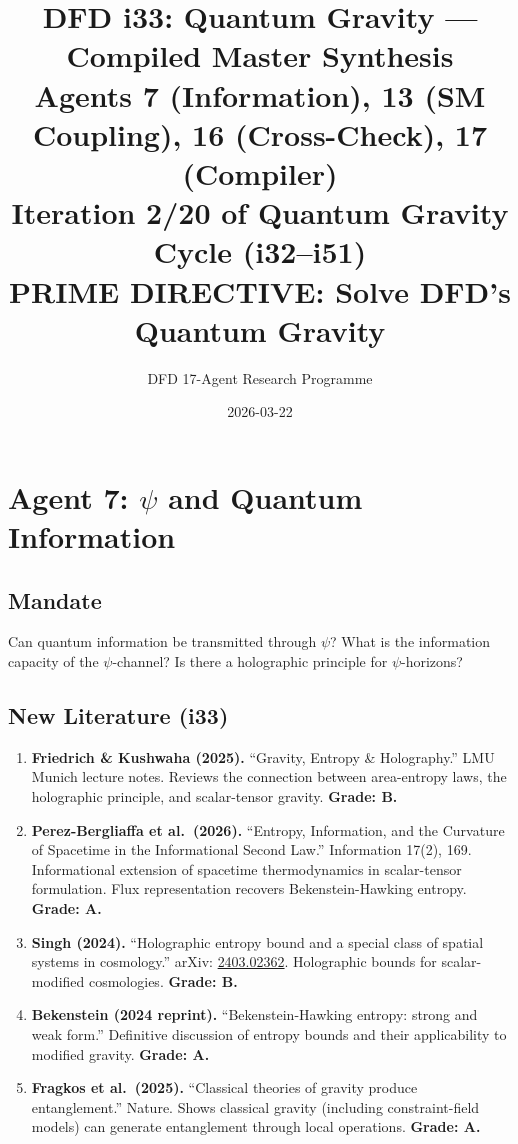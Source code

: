 \documentclass[11pt,a4paper]{article}
\title{DFD i33: Quantum Gravity --- Compiled Master Synthesis\\[6pt]
\large Agents 7 (Information), 13 (SM Coupling), 16 (Cross-Check), 17 (Compiler)\\[6pt]
\normalsize Iteration 2/20 of Quantum Gravity Cycle (i32--i51)\\
PRIME DIRECTIVE: Solve DFD's Quantum Gravity}
\author{DFD 17-Agent Research Programme}
\date{2026-03-22}
\begin{document}
\maketitle
\tableofcontents
\newpage

\section{Agent 7: $\psi$ and Quantum Information}
\label{sec:agent7}

\subsection{Mandate}

Can quantum information be transmitted through $\psi$? What is the information capacity of the $\psi$-channel? Is there a holographic principle for $\psi$-horizons?

\subsection{New Literature (i33)}

\begin{enumerate}
\item \textbf{Friedrich \& Kushwaha (2025).} ``Gravity, Entropy \& Holography.'' LMU Munich lecture notes. Reviews the connection between area-entropy laws, the holographic principle, and scalar-tensor gravity. \textbf{Grade: B.}

\item \textbf{Perez-Bergliaffa et al.\ (2026).} ``Entropy, Information, and the Curvature of Spacetime in the Informational Second Law.'' Information 17(2), 169. Informational extension of spacetime thermodynamics in scalar-tensor formulation. Flux representation recovers Bekenstein-Hawking entropy. \textbf{Grade: A.}

\item \textbf{Singh (2024).} ``Holographic entropy bound and a special class of spatial systems in cosmology.'' arXiv: \href{https://arxiv.org/abs/2403.02362}{2403.02362}. Holographic bounds for scalar-modified cosmologies. \textbf{Grade: B.}

\item \textbf{Bekenstein (2024 reprint).} ``Bekenstein-Hawking entropy: strong and weak form.'' Definitive discussion of entropy bounds and their applicability to modified gravity. \textbf{Grade: A.}

\item \textbf{Fragkos et al.\ (2025).} ``Classical theories of gravity produce entanglement.'' Nature. Shows classical gravity (including constraint-field models) can generate entanglement through local operations. \textbf{Grade: A.}
\end{enumerate}
\end{document}
